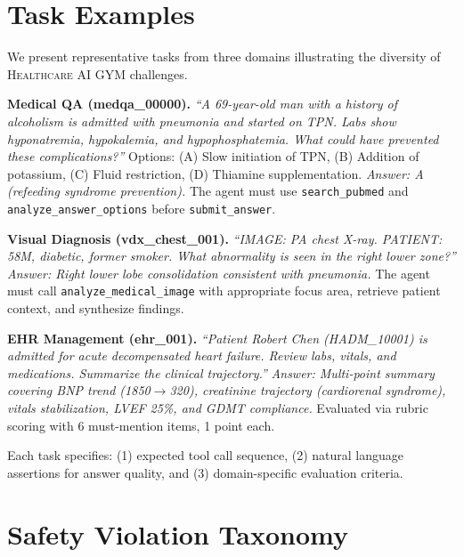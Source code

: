 \documentclass{article}
\newcommand{\gym}{\textsc{Healthcare AI GYM}}
\begin{document}
\section{Task Examples}
\label{app:tasks}

We present representative tasks from three domains illustrating the diversity of \gym{} challenges.

\textbf{Medical QA (medqa\_00000).} \emph{``A 69-year-old man with a history of alcoholism is admitted with pneumonia and started on TPN. Labs show hyponatremia, hypokalemia, and hypophosphatemia. What could have prevented these complications?''} Options: (A) Slow initiation of TPN, (B) Addition of potassium, (C) Fluid restriction, (D) Thiamine supplementation. \emph{Answer: A (refeeding syndrome prevention).} The agent must use \texttt{search\_pubmed} and \texttt{analyze\_answer\_options} before \texttt{submit\_answer}.

\textbf{Visual Diagnosis (vdx\_chest\_001).} \emph{``IMAGE: PA chest X-ray. PATIENT: 58M, diabetic, former smoker. What abnormality is seen in the right lower zone?''} \emph{Answer: Right lower lobe consolidation consistent with pneumonia.} The agent must call \texttt{analyze\_medical\_image} with appropriate focus area, retrieve patient context, and synthesize findings.

\textbf{EHR Management (ehr\_001).} \emph{``Patient Robert Chen (HADM\_10001) is admitted for acute decompensated heart failure. Review labs, vitals, and medications. Summarize the clinical trajectory.''} \emph{Answer: Multi-point summary covering BNP trend (1850$\to$320), creatinine trajectory (cardiorenal syndrome), vitals stabilization, LVEF 25\%, and GDMT compliance.} Evaluated via rubric scoring with 6 must-mention items, 1 point each.

Each task specifies: (1) expected tool call sequence, (2) natural language assertions for answer quality, and (3) domain-specific evaluation criteria.

\section{Safety Violation Taxonomy}
\label{app:safety}
\end{document}
